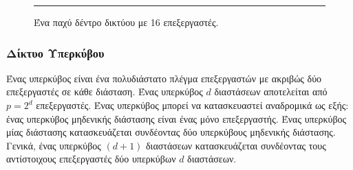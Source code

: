 \documentclass[12pt,a4paper]{article} %
\begin{document}
\begin{figure}[H]
\noindent\rule{\textwidth}{0.2pt}
\caption{Ένα παχύ δέντρο δικτύου με 16 επεξεργαστές.}
\label{fig:graph45}
\end{figure}
\vspace{0.3cm}

\subsubsection*{Δίκτυο Υπερκύβου} 
Ένας υπερκύβος είναι ένα πολυδιάστατο πλέγμα επεξεργαστών με ακριβώς δύο 
επεξεργαστές σε κάθε διάσταση. Ένας υπερκύβος $d$ διαστάσεων αποτελείται 
από $p = 2^d$ επεξεργαστές. Ένας υπερκύβος μπορεί να κατασκευαστεί αναδρομικά 
ως εξής: ένας υπερκύβος μηδενικής διάστασης είναι ένας μόνο επεξεργαστής. 
Ένας υπερκύβος μίας διάστασης κατασκευάζεται συνδέοντας δύο υπερκύβους 
μηδενικής διάστασης. Γενικά, ένας υπερκύβος $(d + 1)$ διαστάσεων κατασκευάζεται 
συνδέοντας τους αντίστοιχους επεξεργαστές δύο υπερκύβων $d$ διαστάσεων.
\end{document}
